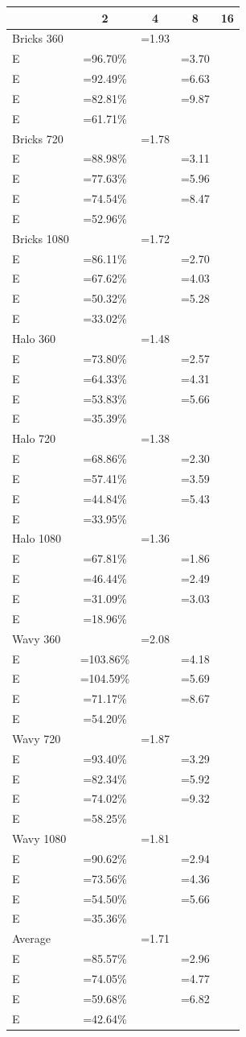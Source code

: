 \newcommand{\SE}[2]{\footnotesize \(\begin{aligned}S&=#1\times \\[-5pt] E&=#2\% \end{aligned}\)}
\begin{tabular}{l|c c c c}
&2&4&8&16\\
\hline
Bricks 360&\SE{1.93}{96.70}&\SE{3.70}{92.49}&\SE{6.63}{82.81}&\SE{9.87}{61.71}\\
Bricks 720&\SE{1.78}{88.98}&\SE{3.11}{77.63}&\SE{5.96}{74.54}&\SE{8.47}{52.96}\\
Bricks 1080&\SE{1.72}{86.11}&\SE{2.70}{67.62}&\SE{4.03}{50.32}&\SE{5.28}{33.02}\\
Halo 360&\SE{1.48}{73.80}&\SE{2.57}{64.33}&\SE{4.31}{53.83}&\SE{5.66}{35.39}\\
Halo 720&\SE{1.38}{68.86}&\SE{2.30}{57.41}&\SE{3.59}{44.84}&\SE{5.43}{33.95}\\
Halo 1080&\SE{1.36}{67.81}&\SE{1.86}{46.44}&\SE{2.49}{31.09}&\SE{3.03}{18.96}\\
Wavy 360&\SE{2.08}{103.86}&\SE{4.18}{104.59}&\SE{5.69}{71.17}&\SE{8.67}{54.20}\\
Wavy 720&\SE{1.87}{93.40}&\SE{3.29}{82.34}&\SE{5.92}{74.02}&\SE{9.32}{58.25}\\
Wavy 1080&\SE{1.81}{90.62}&\SE{2.94}{73.56}&\SE{4.36}{54.50}&\SE{5.66}{35.36}\\
Average&\SE{1.71}{85.57}&\SE{2.96}{74.05}&\SE{4.77}{59.68}&\SE{6.82}{42.64}\\
\end{tabular}